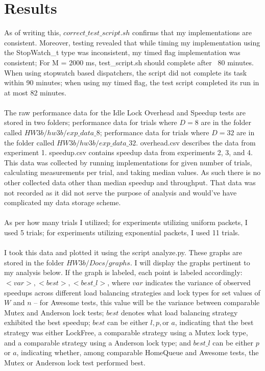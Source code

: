 \documentclass[]{article}
\begin{document}
\section{Results}
As of writing this, $correct\_test\_script.sh$ confirms that my implementations are consistent. Moreover, testing revealed that while timing my implementation using the StopWatch\_t type was inconsistent, my timed flag implementation was consistent; For M = 2000 ms, test\_script.sh should complete after ~80 minutes. When using stopwatch based dispatchers, the script did not complete its task within 90 minutes; when using my timed flag, the test script completed its run in at most 82 minutes.
\\\\
The raw performance data for the Idle Lock Overhead and Speedup tests are stored in two folders; performance data for trials where $D = 8$ are in the folder called $HW3b/hw3b/exp\_data\_8$; performance data for trials where $D = 32$ are in the folder called $HW3b/hw3b/exp\_data\_32$. overhead.csv describes the data from experiment 1. speedup.csv contains speedup data from experiments 2, 3, and 4.
\\
This data was collected by running implementations for given number of trials, calculating measurements per trial, and taking median values. As such there is no other collected data other than median speedup and throughput. That data was not recorded as it did not serve the purpose of analysis and would've have complicated my data storage scheme.
\\\\
As per how many trials I utilized; for experiments utilizing uniform packets, I used 5 trials; for experiments utilizing exponential packets, I used 11 trials.
\\\\
I took this data and plotted it using the script analyze.py. These graphs are stored in the folder $HW3b/Docs/graphs$. I will display the graphs pertinent to my analysis below. If the graph is labeled, each point is labeled accordingly: $<var>,<best>,<best\_l>$, where $var$ indicates the variance of observed speedups across different load balancing strategies and lock types for set values of $W$ and $n$ -- for Awesome tests, this value will be the variance between comparable Mutex and Anderson lock tests; $best$ denotes what load balancing strategy exhibited the best speedup; $best$ can be either $l, p, $or $ a$, indicating that the best strategy was either LockFree, a comparable strategy using a Mutex lock type, and a comparable strategy using a Anderson lock type; and $best\_l$ can be either $p$ or $a$, indicating whether, among comparable HomeQueue and Awesome tests, the Mutex or Anderson lock test performed best.
\end{document}
